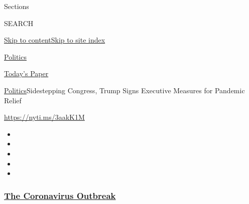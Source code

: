 Sections

SEARCH

\protect\hyperlink{site-content}{Skip to
content}\protect\hyperlink{site-index}{Skip to site index}

\href{https://www.nytimes3xbfgragh.onion/section/politics}{Politics}

\href{https://myaccount.nytimes3xbfgragh.onion/auth/login?response_type=cookie\&client_id=vi}{}

\href{https://www.nytimes3xbfgragh.onion/section/todayspaper}{Today's
Paper}

\href{/section/politics}{Politics}\textbar{}Sidestepping Congress, Trump
Signs Executive Measures for Pandemic Relief

\url{https://nyti.ms/3aakK1M}

\begin{itemize}
\item
\item
\item
\item
\item
\end{itemize}

\hypertarget{the-coronavirus-outbreak}{%
\subsubsection{\texorpdfstring{\href{https://www.nytimes3xbfgragh.onion/news-event/coronavirus?name=styln-coronavirus-national\&region=TOP_BANNER\&variant=undefined\&block=storyline_menu_recirc\&action=click\&pgtype=Article\&impression_id=4d99ba50-e384-11ea-80c5-a5fa522d855a}{The
Coronavirus
Outbreak}}{The Coronavirus Outbreak}}\label{the-coronavirus-outbreak}}

